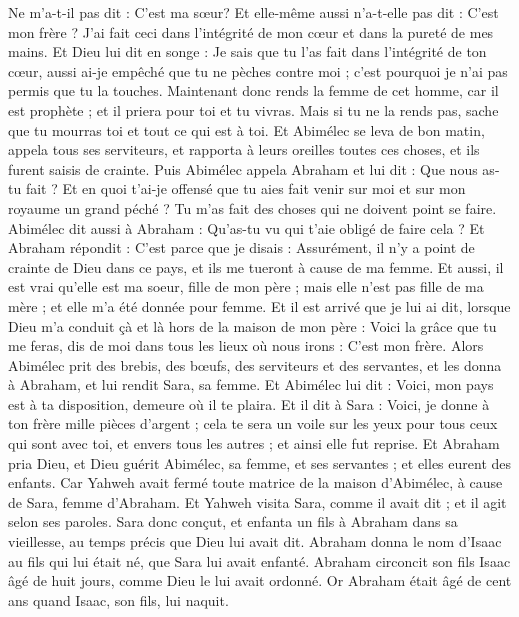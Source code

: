 \begin{multicols}{2}
Ne m'a-t-il pas dit : C'est ma sœur? Et elle-même aussi n'a-t-elle pas dit : C'est mon frère ? J'ai fait ceci dans l'intégrité de mon cœur et dans la pureté de mes mains.
Et Dieu lui dit en songe : Je sais que tu l'as fait dans l'intégrité de ton cœur, aussi ai-je empêché que tu ne pèches contre moi ; c'est pourquoi je n'ai pas permis que tu la touches.
Maintenant donc rends la femme de cet homme, car il est prophète ; et il priera pour toi et tu vivras. Mais si tu ne la rends pas, sache que tu mourras toi et tout ce qui est à toi.
Et Abimélec se leva de bon matin, appela tous ses serviteurs, et rapporta à leurs oreilles toutes ces choses, et ils furent saisis de crainte.
Puis Abimélec appela Abraham et lui dit : Que nous as-tu fait ? Et en quoi t'ai-je offensé que tu aies fait venir sur moi et sur mon royaume un grand péché ? Tu m'as fait des choses qui ne doivent point se faire.
Abimélec dit aussi à Abraham : Qu'as-tu vu qui t'aie obligé de faire cela ?
Et Abraham répondit : C'est parce que je disais : Assurément, il n'y a point de crainte de Dieu dans ce pays, et ils me tueront à cause de ma femme.
Et aussi, il est vrai qu'elle est ma soeur, fille de mon père ; mais elle n'est pas fille de ma mère ; et elle m'a été donnée pour femme.
Et il est arrivé que je lui ai dit, lorsque Dieu m'a conduit çà et là hors de la maison de mon père : Voici la grâce que tu me feras, dis de moi dans tous les lieux où nous irons : C'est mon frère.
Alors Abimélec prit des brebis, des bœufs, des serviteurs et des servantes, et les donna à Abraham, et lui rendit Sara, sa femme.
Et Abimélec lui dit : Voici, mon pays est à ta disposition, demeure où il te plaira.
Et il dit à Sara : Voici, je donne à ton frère mille pièces d'argent ; cela te sera un voile sur les yeux pour tous ceux qui sont avec toi, et envers tous les autres ; et ainsi elle fut reprise.
Et Abraham pria Dieu, et Dieu guérit Abimélec, sa femme, et ses servantes ; et elles eurent des enfants.
Car Yahweh avait fermé toute matrice de la maison d'Abimélec, à cause de Sara, femme d'Abraham.
\VerseOne{}Et Yahweh visita Sara, comme il avait dit ; et il agit selon ses paroles.
Sara donc conçut, et enfanta un fils à Abraham dans sa vieillesse, au temps précis que Dieu lui avait dit.
Abraham donna le nom d'Isaac au fils qui lui était né, que Sara lui avait enfanté.
Abraham circoncit son fils Isaac âgé de huit jours, comme Dieu le lui avait ordonné.
Or Abraham était âgé de cent ans quand Isaac, son fils, lui naquit.

\end{multicols}
